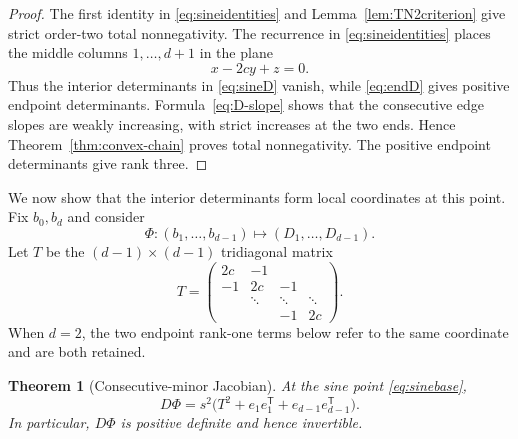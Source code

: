 \documentclass{amsart}
\numberwithin{equation}{section}
\newtheorem{theorem}{Theorem}
\theoremstyle{definition}
\theoremstyle{remark}
\newcommand{\transpose}{\mathsf T}
\begin{document}
\begin{proof}
The first identity in \eqref{eq:sineidentities} and Lemma~\ref{lem:TN2criterion} give strict order-two total nonnegativity.  The recurrence in \eqref{eq:sineidentities} places the middle columns $1,\ldots,d+1$ in the plane
\begin{equation}\label{eq:sineplane}
 x-2cy+z=0.
\end{equation}
Thus the interior determinants in \eqref{eq:sineD} vanish, while \eqref{eq:endD} gives positive endpoint determinants.  Formula~\eqref{eq:D-slope} shows that the consecutive edge slopes are weakly increasing, with strict increases at the two ends.  Hence Theorem~\ref{thm:convex-chain} proves total nonnegativity.  The positive endpoint determinants give rank three.
\end{proof}

We now show that the interior determinants form local coordinates at this point.  Fix $b_0,b_d$ and consider
\begin{equation}\label{eq:Phi}
 \Phi:(b_1,\ldots,b_{d-1})
 \longmapsto
 (D_1,\ldots,D_{d-1}).
\end{equation}
Let $T$ be the $(d-1)\times(d-1)$ tridiagonal matrix
\begin{equation}\label{eq:Tmatrix}
 T=
 \begin{pmatrix}
 2c&-1&&\\
 -1&2c&-1&\\
 &\ddots&\ddots&\ddots\\
 &&-1&2c
 \end{pmatrix}.
\end{equation}
When $d=2$, the two endpoint rank-one terms below refer to the same coordinate and are both retained.

\begin{theorem}[Consecutive-minor Jacobian]\label{thm:jacobian}
At the sine point \eqref{eq:sinebase},
\begin{equation}\label{eq:jacobian}
 D\Phi
 =s^2\bigl(T^2+e_1e_1^{\transpose}+e_{d-1}e_{d-1}^{\transpose}\bigr).
\end{equation}
In particular, $D\Phi$ is positive definite and hence invertible.
\end{theorem}
\end{document}

